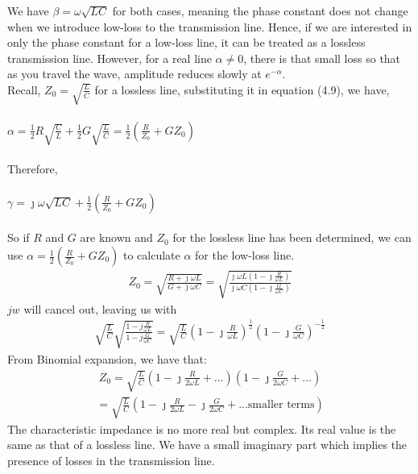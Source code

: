 We have $\beta = \omega\sqrt{LC}$ for both cases, meaning the phase constant does not change when we introduce low-loss to the transmission line. Hence, if we are interested in only the phase constant for a low-loss line, it can be treated as a lossless transmission line. However, for a real line $\alpha \neq 0$, there is that small loss so that as you travel the wave, amplitude reduces slowly at $e^{-\alpha}$.\\ Recall, $Z_0 = \sqrt{\frac{L}{C}}$ for a lossless line, substituting it in equation (4.9), we have,\\\\
$\alpha = \frac{1}{2}R\sqrt{\frac{C}{L}} + \frac{1}{2}G\sqrt{\frac{L}{C}} = \frac{1}{2}(\frac{R}{Z_0} + GZ_0)$\\\\
Therefore,\\\\
$\gamma = \jmath\omega\sqrt{LC} + \frac{1}{2}(\frac{R}{Z_0} + GZ_0)$\\\\
So if $R$ and $G$ are known and $Z_0$ for the lossless line has been determined, we can use $\alpha = \frac{1}{2}(\frac{R}{Z_0} + GZ_0)$ to calculate $\alpha$ for the low-loss line.
\begin{align*}
Z_0 = \sqrt{\frac{R + \jmath\omega L}{G + \jmath\omega C}} = \sqrt{\frac{\jmath\omega L(1 - \jmath\frac{R}{\omega L})}{\jmath\omega C(1 - \jmath\frac{G}{\omega C})}}
\end{align*}
$jw$ will cancel out, leaving us with
\begin{align*}
\sqrt{\frac{L}{C}}\sqrt{\frac{1 - j\frac{R}{\omega L}}{1 - j\frac{G}{\omega C}}} =\sqrt{\frac{L}{C}}\left(1 - \jmath\frac{R}{\omega L}\right)^{\frac{1}{2}}\left(1 - \jmath\frac{G}{\omega C}\right)^{-\frac{1}{2}} 
\end{align*}
From Binomial expansion, we have that:
\begin{align*}
Z_0 = \sqrt{\frac{L}{C}}\left(1 - \jmath\frac{R}{2\omega L} + ...\right)\left(1 - \jmath\frac{G}{2\omega C} + ...\right)
\end{align*}
\begin{align*}
= \sqrt{\frac{L}{C}}\left(1 - \jmath\frac{R}{2\omega L} - \jmath\frac{G}{2\omega C} + \text{...smaller terms}\right)
\end{align*}
The characteristic impedance is no more real but complex. Its real value is the same as that of a lossless line. We have a small imaginary part which implies the presence of losses in the transmission line.\\

